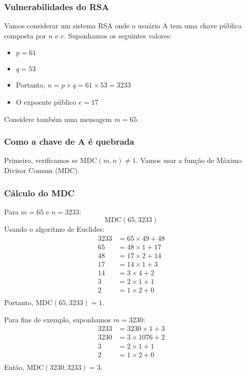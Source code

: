 \documentclass[a4paper,12pt]{article}
\begin{document}
\subsubsection*{Vulnerabilidades do RSA}
Vamos considerar um sistema RSA onde o usuário A tem uma chave pública composta por \( n \) e \( e \). Suponhamos os seguintes valores:
\begin{itemize}
    \item \( p = 61 \)
    \item \( q = 53 \)
    \item Portanto, \( n = p \times q = 61 \times 53 = 3233 \)
    \item O expoente público \( e = 17 \)
\end{itemize}
Considere também uma mensagem \( m = 65 \).

\subsubsection*{Como a chave de A é quebrada}
Primeiro, verificamos se \( \text{MDC}(m, n) \neq 1 \). Vamos usar a função de Máximo Divisor Comum (MDC).

\subsubsection*{Cálculo do MDC}
Para \( m = 65 \) e \( n = 3233 \):
\[
\text{MDC}(65, 3233)
\]
Usando o algoritmo de Euclides:
\begin{align*}
3233 &= 65 \times 49 + 48 \\
65 &= 48 \times 1 + 17 \\
48 &= 17 \times 2 + 14 \\
17 &= 14 \times 1 + 3 \\
14 &= 3 \times 4 + 2 \\
3 &= 2 \times 1 + 1 \\
2 &= 1 \times 2 + 0 \\
\end{align*}
Portanto, \( \text{MDC}(65, 3233) = 1 \).

Para fins de exemplo, suponhamos \( m = 3230 \):
\begin{align*}
3233 &= 3230 \times 1 + 3 \\
3230 &= 3 \times 1076 + 2 \\
3 &= 2 \times 1 + 1 \\
2 &= 1 \times 2 + 0 \\
\end{align*}
Então, \( \text{MDC}(3230, 3233) = 3 \).
\end{document}
